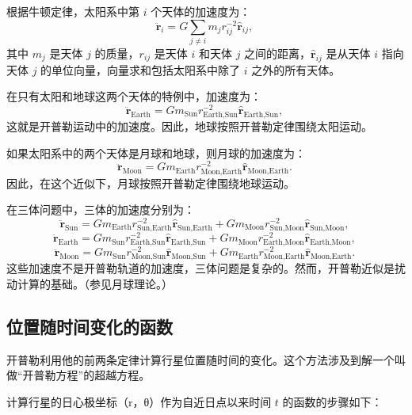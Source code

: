 根据牛顿定律，太阳系中第 \(i\) 个天体的加速度为：
\[
\mathbf{\ddot{r}}_i = G \sum_{j \neq i} m_j r_{ij}^{-2} \hat{\mathbf{r}}_{ij},~
\]
其中 \( m_j \) 是天体 \( j \) 的质量，\( r_{ij} \) 是天体 \(i\) 和天体 \(j\) 之间的距离，\(\hat{\mathbf{r}}_{ij}\) 是从天体 \(i\) 指向天体 \(j\) 的单位向量，向量求和包括太阳系中除了 \(i\) 之外的所有天体。

在只有太阳和地球这两个天体的特例中，加速度为：
\[
\mathbf{\ddot{r}}_{\text{Earth}} = G m_{\text{Sun}} r_{\text{Earth}, \text{Sun}}^{-2} \hat{\mathbf{r}}_{\text{Earth}, \text{Sun}},~
\]
这就是开普勒运动中的加速度。因此，地球按照开普勒定律围绕太阳运动。

如果太阳系中的两个天体是月球和地球，则月球的加速度为：
\[
\mathbf{\ddot{r}}_{\text{Moon}} = G m_{\text{Earth}} r_{\text{Moon}, \text{Earth}}^{-2} \hat{\mathbf{r}}_{\text{Moon}, \text{Earth}}.~
\]
因此，在这个近似下，月球按照开普勒定律围绕地球运动。

在三体问题中，三体的加速度分别为：
\[
\mathbf{\ddot{r}}_{\text{Sun}} = G m_{\text{Earth}} r_{\text{Sun}, \text{Earth}}^{-2} \hat{\mathbf{r}}_{\text{Sun}, \text{Earth}} + G m_{\text{Moon}} r_{\text{Sun}, \text{Moon}}^{-2} \hat{\mathbf{r}}_{\text{Sun}, \text{Moon}},~
\]
\[
\mathbf{\ddot{r}}_{\text{Earth}} = G m_{\text{Sun}} r_{\text{Earth}, \text{Sun}}^{-2} \hat{\mathbf{r}}_{\text{Earth}, \text{Sun}} + G m_{\text{Moon}} r_{\text{Earth}, \text{Moon}}^{-2} \hat{\mathbf{r}}_{\text{Earth}, \text{Moon}},~
\]
\[
\mathbf{\ddot{r}}_{\text{Moon}} = G m_{\text{Sun}} r_{\text{Moon}, \text{Sun}}^{-2} \hat{\mathbf{r}}_{\text{Moon}, \text{Sun}} + G m_{\text{Earth}} r_{\text{Moon}, \text{Earth}}^{-2} \hat{\mathbf{r}}_{\text{Moon}, \text{Earth}}.~
\]
这些加速度不是开普勒轨道的加速度，三体问题是复杂的。然而，开普勒近似是扰动计算的基础。（参见月球理论。）
\subsection{位置随时间变化的函数}
开普勒利用他的前两条定律计算行星位置随时间的变化。这个方法涉及到解一个叫做“开普勒方程”的超越方程。

计算行星的日心极坐标（r，θ）作为自近日点以来时间 \(t\) 的函数的步骤如下：

